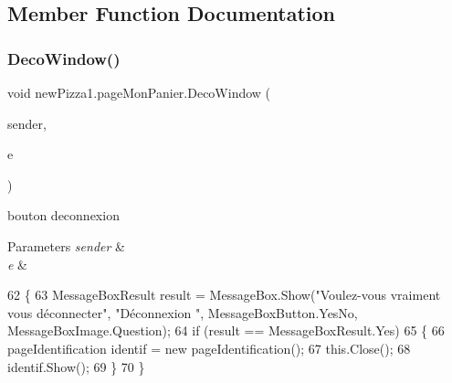 \subsection{Member Function Documentation}
\mbox{\label{classnewPizza1_1_1pageMonPanier_ae1cabba382a90962934b5b48aa31b235}} 
\subsubsection{\texorpdfstring{Deco\+Window()}{DecoWindow()}}
{\footnotesize\ttfamily void new\+Pizza1.\+page\+Mon\+Panier.\+Deco\+Window (\begin{DoxyParamCaption}\item[{object}]{sender,  }\item[{Routed\+Event\+Args}]{e }\end{DoxyParamCaption})\hspace{0.3cm}{\ttfamily [inline]}}



bouton deconnexion 


\begin{DoxyParams}{Parameters}
{\em sender} & \\
\hline
{\em e} & \\
\hline
\end{DoxyParams}

\begin{DoxyCode}
62         \{
63             MessageBoxResult result = MessageBox.Show(\textcolor{stringliteral}{"Voulez-vous vraiment vous déconnecter"}, \textcolor{stringliteral}{"Déconnexion
      "}, MessageBoxButton.YesNo, MessageBoxImage.Question);
64             \textcolor{keywordflow}{if} (result == MessageBoxResult.Yes)
65             \{
66                 pageIdentification identif = \textcolor{keyword}{new} pageIdentification();
67                 this.Close();
68                 identif.Show();
69             \}
70         \}
\end{DoxyCode}
\mbox{\label{classnewPizza1_1_1pageMonPanier_af3487726644a638a98b47b824460a5f9}} 
